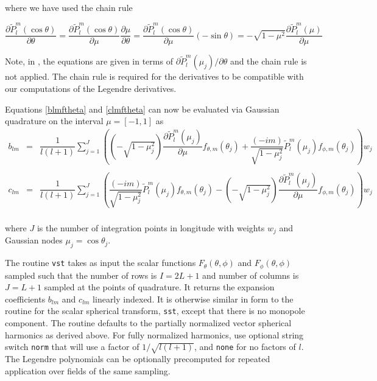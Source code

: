 where we have used the chain rule 

\[
\dfrac{\partial \widetilde{P}_l^m(\cos\theta)}{\partial\theta} = \dfrac{\partial \widetilde{P}_l^m(\cos\theta)}{\partial\mu}\dfrac{\partial\mu}{\partial\theta} = \dfrac{\partial \widetilde{P}_l^m(\cos\theta)}{\partial\mu} (-\sin\theta) = -\sqrt{1-\mu^2}\dfrac{\partial \widetilde{P}_l^m(\mu)}{\partial\mu} \]

Note, in \cite{yucel2008helmholtz}, the equations are given in terms of $\partial \widetilde{P}_l^m(\mu_j)/\partial\theta$ and the chain rule is not applied. The chain rule is required for the derivatives to be compatible with our computations of the Legendre derivatives.  




Equations \eqref{blmftheta} and \eqref{clmftheta} can now be evaluated via Gaussian quadrature on the interval $\mu = [-1, 1]$ as 
\begin{eqnarray}
b_{lm} &=& \dfrac{1}{l(l+1)}\sum_{j=1}^J \left( \left(-\sqrt{1-\mu_j^2}\right)\dfrac{\partial \widetilde{P}_l^m(\mu_j)}{\partial\mu}f_{\theta,m}(\theta_j)   + \dfrac{(-im)}{\sqrt{1-\mu_j^2}} \widetilde{P}_l^m(\mu_j) f_{\phi,m}(\theta_j)  \right) w_j  \nonumber \\
\ & \ & \label{eqblm1}
\end{eqnarray}
\begin{eqnarray}
c_{lm} &=& \dfrac{1}{l(l+1)}\sum_{j=1}^J \left( \dfrac{(-im)}{\sqrt{1-\mu_j^2}} \widetilde{P}_l^m(\mu_j) f_{\theta,m}(\theta_j)   -  \left(-\sqrt{1-\mu_j^2}\right)\dfrac{\partial \widetilde{P}_l^m(\mu_j)}{\partial\mu} f_{\phi,m}(\theta_j)  \right) w_j \nonumber \\
\ & \ & \label{eqclm1}
\end{eqnarray}

\noindent where $J$ is the number of integration points in longitude with weights $w_j$ and Gaussian nodes $\mu_j = \cos\theta_j$.  


The routine \texttt{vst} takes as input the scalar functions $F_{\theta}(\theta,\phi)$ and $F_{\phi}(\theta,\phi)$ sampled such that the number of rows is $I = 2L+1$ and number of columns is $J = L+1$ sampled at the points of quadrature.  It returns the expansion coefficients $b_{lm}$ and $c_{lm}$ linearly indexed. It is otherwise similar in form to the routine for the scalar spherical transform, \texttt{sst}, except that there is no monopole component.  The routine defaults to the partially normalized vector spherical harmonics as derived above. For fully normalized harmonics, use optional string switch \texttt{norm} that will use a factor of $1/\sqrt{l (l+1)}$, and \texttt{none} for no factors of $l$.  The Legendre polynomials can be optionally precomputed for repeated application over fields of the same sampling.

